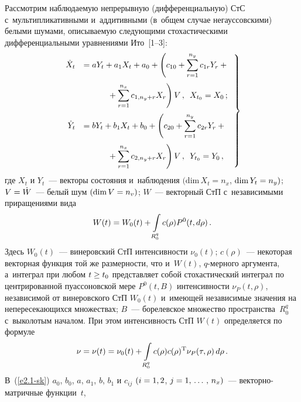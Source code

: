 \begin{multicols}{2}
Рассмотрим наблюдаемую непрерывную (дифференциальную) СтС
с~мультипликативными и~аддитивными (в~общем случае негауссовскими)
белыми шумами, описываемую следующими стохастическими  дифференциальными
уравнениями Ито~[1--3]:
   \begin{equation}
   \left.
   \begin{array}{rl}
  \hspace*{-1mm}\dot X_t &=aY_t +a_{1}X_t+a_{0} + \left( c_{10} +
    \displaystyle\sss_{r=1}^{n_y} c_{1r} Y_r +  {}\right.\\[16pt]
&\left.\displaystyle \hspace*{10mm}{}+   \sss_{r=1}^{n_x} c_{1,n_y+r} X_r\right) V\,,\enskip X_{t_0} = X_0\,;\\[16pt]
     \hspace*{-1mm}\dot Y_t &= bY_t +b_1X_t+b_0  + \left( c_{20} +
   \displaystyle\sss_{r=1}^{n_y} c_{2r} Y_r +{}\right.\\[16pt]
   &\left.\hspace*{10mm}{}+
\displaystyle    \sss_{r=1}^{n_x} c_{2,n_y+r} X_r\right) V\,,\enskip Y_{t_0} = Y_0\,,
    \end{array}
    \right\}
\label{e2.1-sk}
\end{equation}
где $X_t$ и $Y_t$~--- векторы состояния и~наблюдения
$(\mathrm{dim}\, X_t = n_x$, $\mathrm{dim}\, Y_t \hm= n_y)$;  $V\hm=\dot W$~---
белый шум $(\mathrm{dim}\, V \hm= n_v)$; $W$~---
векторный СтП с~независимыми приращениями вида
\begin{equation}
W(t)= W_0(t) + \int\limits\limits_{R_0^q} c(\rho) P^0 (t, d\rho)\,.\label{e2.2-sk}
\end{equation}
Здесь $W_0(t)$~--- винеровский СтП интенсивности  $\nu_0(t)$;
$c(\rho)$~--- некоторая векторная функция той же размерности, что
и~$W(t)$, $q$-мер\-но\-го аргумента, а~интеграл при любом  $t\hm\ge t_0$
представляет собой стохастический интеграл по центрированной пуассоновской мере
$P^0 (t, B)$ интенсивности $\nu_P (t, \rho)$, независимой
от винеровского СтП $W_0(t)$ и~име\-ющей независимые значения на
непересекающихся множествах; $B$~---
борелевское множество пространства~$R_0^q$ с~выколотым началом.
При этом интенсивность СтП $W(t)$ определяется по формуле~\cite{1-sk, 3-sk, 4-sk}
\begin{equation*}
\nu =\nu(t) = \nu_0(t) +
\iii_{R_0^q} c(\rho) c (\rho)^{\mathrm{T}}
 \nu_P (\tau,\rho)\, d\rho\,. %
\end{equation*}
В~(\ref{e2.1-sk}) $a_0$, $b_0$, $a$, $a_1$, $b$, $b_1$ и
$c_{ij}$ $(i\hm=1,2$, $j\hm=1\tr n_x)$~--- век\-тор\-но-мат\-рич\-ные функции~$t$,

\end{multicols}
